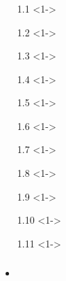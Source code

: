 

\xdef\sectiontitle{\Isectiontitle} %

\begin{frame}[label=1_4_a]%
\frametitle{\texorpdfstring{\culine[\sectiontitleulinecolor]{\sectiontitle}}{\sectiontitle} }

\vspace{0.5cm}

\begin{itemize}[leftmargin=0.5cm,itemsep=2mm]
    \item[1.1]<1-> \hyperlink{1_1_a}{\IaSubsectiontitle}
    \item[1.2]<1-> \hyperlink{1_2_a}{\IbSubsectiontitle}	
    \item[1.3]<1-> \hyperlink{1_3_a}{\IcSubsectiontitle}	
    \item[1.4]<1-> \hyperlink{1_4_a}{\Alert[red]{\IdSubsectiontitle}}
    \item[1.5]<1-> \hyperlink{1_5_a}{\IeSubsectiontitle}
    \item[1.6]<1-> \hyperlink{1_6_a}{\IfSubsectiontitle}
    \item[1.7]<1-> \hyperlink{1_7_a}{\IgSubsectiontitle}
\end{itemize}

\vspace{-1cm}
\begin{itemize}[leftmargin=9.5cm,itemsep=2mm]
    \item[1.8]<1-> \hyperlink{1_8_a}{\IhSubsectiontitle}
	\item[1.9]<1-> \hyperlink{1_9_a}{\IiSubsectiontitle}
	\item[1.10]<1-> \hyperlink{1_10_a}{\IjSubsectiontitle}
	\item[1.11]<1-> \hyperlink{1_11_a}{\IkSubsectiontitle}
\end{itemize}

\endofslide \end{frame}

\xdef\sectiontitle{\IdSubsectiontitle}

\begin{frame}%
\frametitle{\texorpdfstring{\culine[\sectiontitleulinecolor]{\sectiontitle}}{\sectiontitle} }

\begin{itemize}
	\item 
\end{itemize}

\endofslide 
\end{frame}

